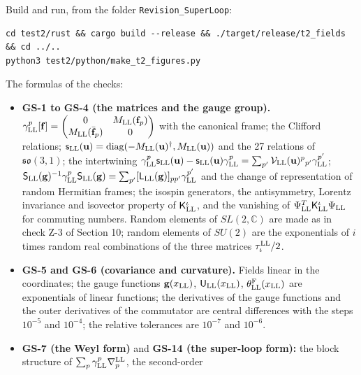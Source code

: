 \documentclass[
  10pt,
]{article}
\providecommand{\tightlist}{%
  \setlength{\itemsep}{0pt}\setlength{\parskip}{0pt}}
\begin{document}
Build and run, from the folder \texttt{Revision\_SuperLoop}:

\begin{verbatim}
cd test2/rust && cargo build --release && ./target/release/t2_fields && cd ../..
python3 test2/python/make_t2_figures.py
\end{verbatim}

The formulas of the checks:

\begin{itemize}
\tightlist
\item
  \textbf{GS-1 to GS-4 (the matrices and the gauge group).}
  \(\gamma^p_{\rm LL}[\mathbf f]=\begin{pmatrix}0&M_{\rm LL}(\mathbf f_p)\\M_{\rm LL}(\bar{\mathbf f}_p)&0\end{pmatrix}\)
  with the canonical frame; the Clifford relations;
  \(\mathsf s_{\rm LL}(\mathbf u)=\mathrm{diag}(-M_{\rm LL}(\mathbf u)^\dagger,M_{\rm LL}(\mathbf u))\)
  and the 27 relations of \(\mathfrak{so}(3,1)\); the intertwining
  \(\gamma^p_{\rm LL}\mathsf s_{\rm LL}(\mathbf u)-\mathsf s_{\rm LL}(\mathbf u)\gamma^p_{\rm LL}=\sum_{p'}\mathcal V_{\rm LL}(\mathbf u)^p{}_{p'}\gamma^{p'}_{\rm LL}\);
  \(\mathsf S_{\rm LL}(\mathbf g)^{-1}\gamma^p_{\rm LL}\mathsf S_{\rm LL}(\mathbf g)=\sum_{p'}[\mathsf L_{\rm LL}(\mathbf g)]_{pp'}\gamma^{p'}_{\rm LL}\)
  and the change of representation of random Hermitian frames; the
  isospin generators, the antisymmetry, Lorentz invariance and isovector
  property of \(\mathsf K^\iota_{\rm LL}\), and the vanishing of
  \(\Psi^T_{\rm LL}\mathsf K^\iota_{\rm LL}\Psi_{\rm LL}\) for commuting
  numbers. Random elements of \(SL(2,\mathbb C)\) are made as in check
  Z-3 of Section 10; random elements of \(SU(2)\) are the exponentials
  of \(i\) times random real combinations of the three matrices
  \(\tau^{\rm LL}_\iota/2\).
\item
  \textbf{GS-5 and GS-6 (covariance and curvature).} Fields linear in
  the coordinates; the gauge functions \(\mathbf g(x_{\rm LL})\),
  \(\mathsf U_{\rm LL}(x_{\rm LL})\),
  \(\theta^{\rm F}_{\rm LL}(x_{\rm LL})\) are exponentials of linear
  functions; the derivatives of the gauge functions and the outer
  derivatives of the commutator are central differences with the steps
  \(10^{-5}\) and \(10^{-4}\); the relative tolerances are \(10^{-7}\)
  and \(10^{-6}\).
\item
  \textbf{GS-7 (the Weyl form)} and \textbf{GS-14 (the super-loop
  form):} the block structure of
  \(\sum_p\gamma^p_{\rm LL}\nabla^{\rm LL}_p\), the second-order

\end{itemize}
\end{document}
